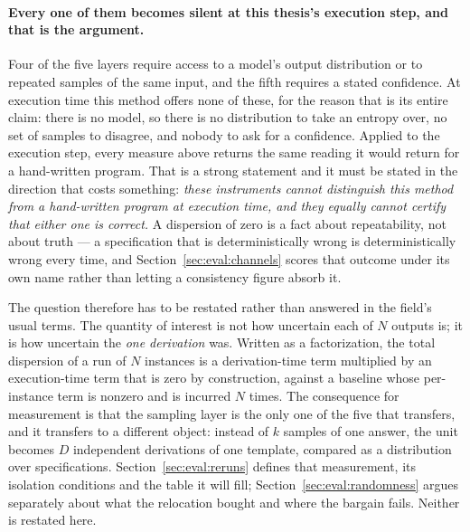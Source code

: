 \paragraph{Every one of them becomes silent at this thesis's execution step, and that is the
argument.}
Four of the five layers require access to a model's output distribution or to repeated samples
of the same input, and the fifth requires a stated confidence. At execution time this method
offers none of these, for the reason that is its entire claim: there is no model, so there is
no distribution to take an entropy over, no set of samples to disagree, and nobody to ask for a
confidence. Applied to the execution step, every measure above returns the same reading it
would return for a hand-written program. That is a strong statement and it must be stated in
the direction that costs something: \emph{these instruments cannot distinguish this method from
a hand-written program at execution time, and they equally cannot certify that either one is
correct.} A dispersion of zero is a fact about repeatability, not about truth --- a
specification that is deterministically wrong is deterministically wrong every time, and
Section~\ref{sec:eval:channels} scores that outcome under its own name rather than letting a
consistency figure absorb it.

The question therefore has to be restated rather than answered in the field's usual terms. The
quantity of interest is not how uncertain each of $N$ outputs is; it is how uncertain the
\emph{one derivation} was. Written as a factorization, the total dispersion of a run of $N$
instances is a derivation-time term multiplied by an execution-time term that is zero by
construction, against a baseline whose per-instance term is nonzero and is incurred $N$ times.
The consequence for measurement is that the sampling layer is the only one of the five that
transfers, and it transfers to a different object: instead of $k$ samples of one answer, the
unit becomes $D$ independent derivations of one template, compared as a distribution over
specifications. Section~\ref{sec:eval:reruns} defines that measurement, its isolation
conditions and the table it will fill; Section~\ref{sec:eval:randomness} argues separately
about what the relocation bought and where the bargain fails. Neither is restated here.

